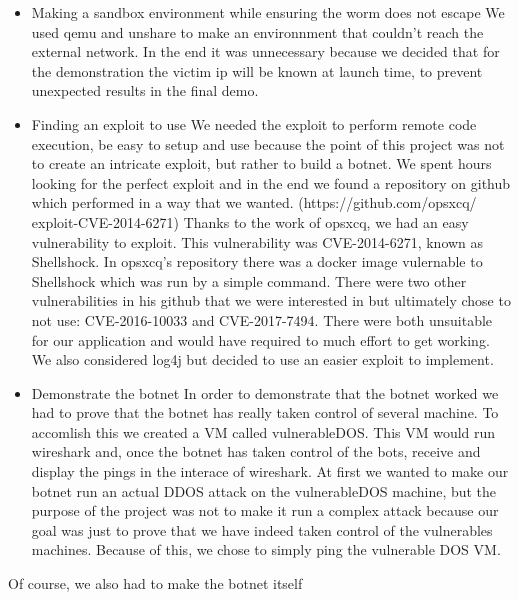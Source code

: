 \documentclass[../main.tex]{subfiles}
\begin{document}
    \begin{itemize}

        \item Making a sandbox environment while ensuring the worm does not escape 
        We used qemu and unshare to make an environnment that couldn't reach the external network.
        In the end it was unnecessary because we decided that for the demonstration the victim ip will be known at launch time, to prevent unexpected results in the final demo. 

        \item Finding an exploit to use
        We needed the exploit to perform remote code execution, be easy to setup and use because the point of this project was not to create an intricate exploit, but rather to build a botnet.
        We spent hours looking for the perfect exploit and in the end we found a repository on github which performed in a way that we wanted.
        (https://github.com/opsxcq/
        exploit-CVE-2014-6271)
        Thanks to the work of opsxcq, we had an easy vulnerability to exploit.
        This vulnerability was CVE-2014-6271, known as Shellshock.
        In opsxcq's repository there was a docker image vulernable to Shellshock which was run by a simple command.
        There were two other vulnerabilities in his github that we were interested in but ultimately chose to not use: CVE-2016-10033 and CVE-2017-7494.
        There were both unsuitable for our application and would have required to much effort to get working. 
        We also considered log4j but decided to use an easier exploit to implement.

        \item Demonstrate the botnet
        In order to demonstrate that the botnet worked we had to prove that the botnet has really taken control of several machine.
        To accomlish this we created a VM called vulnerableDOS. This VM would run wireshark and, once the botnet has taken control of the bots, receive and display the pings in the interace of wireshark.
        At first we wanted to make our botnet run an actual DDOS attack on the vulnerableDOS machine, but the purpose of the project was not to make it run a complex attack because our goal was just to prove that we have indeed taken control of the vulnerables machines. Because of this, we chose to simply ping the vulnerable DOS VM.

    \end{itemize}

    Of course, we also had to make the botnet itself 
\end{document}
